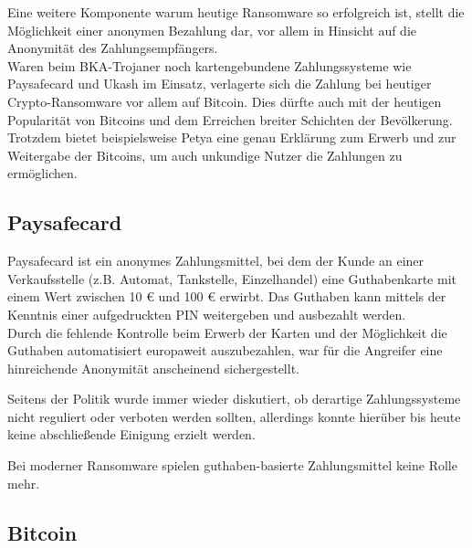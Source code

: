 Eine weitere Komponente warum heutige Ransomware so erfolgreich ist, stellt die Möglichkeit einer anonymen Bezahlung dar, vor allem in Hinsicht auf die Anonymität des Zahlungsempfängers. \\
Waren beim BKA-Trojaner noch kartengebundene Zahlungssysteme wie Paysafecard und Ukash im Einsatz, verlagerte sich die Zahlung bei heutiger Crypto-Ransomware vor allem auf Bitcoin. Dies dürfte auch mit der heutigen Popularität von Bitcoins und dem Erreichen breiter Schichten der Bevölkerung. Trotzdem bietet beispielsweise Petya eine genau Erklärung zum Erwerb und zur Weitergabe der Bitcoins, um auch unkundige Nutzer die Zahlungen zu ermöglichen. \cite{petya:infect}

\subsection{Paysafecard}
Paysafecard ist ein anonymes Zahlungsmittel, bei dem der Kunde an einer Verkaufsstelle (z.B. Automat, Tankstelle, Einzelhandel) eine Guthabenkarte mit einem Wert zwischen 10 € und 100 € erwirbt. Das Guthaben kann mittels der Kenntnis einer aufgedruckten PIN weitergeben und ausbezahlt werden. \\
Durch die fehlende Kontrolle beim Erwerb der Karten und der Möglichkeit die Guthaben automatisiert europaweit auszubezahlen, war für die Angreifer eine hinreichende Anonymität anscheinend sichergestellt. 

Seitens der Politik wurde immer wieder diskutiert, ob derartige Zahlungssysteme nicht reguliert oder verboten werden sollten, allerdings konnte hierüber bis heute keine abschließende Einigung erzielt werden. \cite{paysafecard}

Bei moderner Ransomware spielen guthaben-basierte Zahlungsmittel keine Rolle mehr.

\subsection{Bitcoin}

